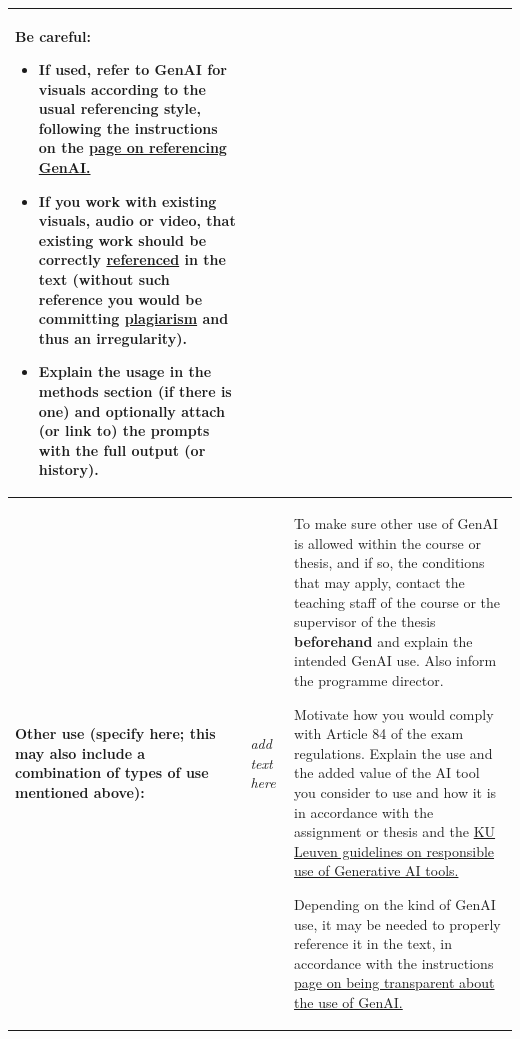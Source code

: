 \begin{longtable}{|p{}|p{}|p{}|}
\medskip
\textbf{Be careful:}
\begin{itemize}
    \item If used, refer to GenAI for visuals according to the usual referencing style, following the instructions on the \href{https://bib.kuleuven.be/english/training-and-tutorials/citation/refering-to-genai}{page on referencing GenAI.}
    \item If you work with existing visuals, audio or video, \textbf{that existing work should be correctly \href{https://bib.kuleuven.be/english/training-and-tutorials/citation}{referenced} in the text} (without such reference you would be committing \href{https://www.kuleuven.be/english/education/plagiarism/index}{plagiarism} and thus an irregularity).
    \item Explain the usage in the methods section (if there is one) and optionally attach (or link to) the prompts with the full output (or history).
\end{itemize} \\ \hline
\textbf{Other use (specify here; this may also include a combination of types of use mentioned above):} & \textit{add text here} & To make sure other use of GenAI is allowed within the course or thesis, and if so, the conditions that may apply, contact the teaching staff of the course or the supervisor of the thesis \textbf{beforehand} and explain the intended GenAI use. Also inform the programme director. 

\medskip
Motivate how you would comply with Article 84 of the exam regulations. Explain the use and the added value of the AI tool you consider to use and how it is in accordance with the assignment or thesis and the \href{https://www.kuleuven.be/english/genai}{KU Leuven guidelines on responsible use of Generative AI tools.} 

\medskip
Depending on the kind of GenAI use, it may be needed to properly reference it in the text, in accordance with the instructions \href{https://www.kuleuven.be/english/education/student/educational-tools/generative-artificial-intelligence#Transparency}{page on being transparent about the use of GenAI.}\\ \hline
\end{longtable}